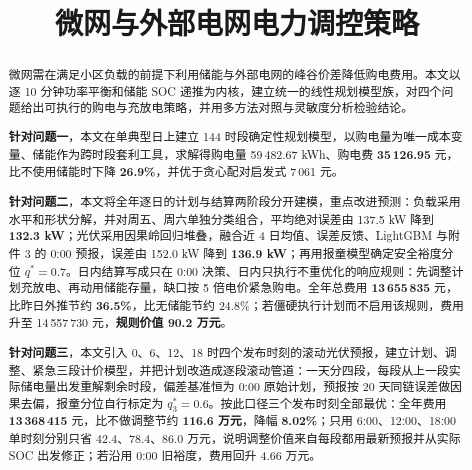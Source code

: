 \documentclass[withoutpreface,bwprint]{cumcmthesis}
\title{微网与外部电网电力调控策略}
\begin{document}
\maketitle

\begin{abstract}

微网需在满足小区负载的前提下利用储能与外部电网的峰谷价差降低购电费用\nobreak。本文以逐 10 分钟功率平衡和储能 SOC 递推为内核\nobreak，建立统一的线性规划模型族\nobreak，对四个问题给出可执行的购电与充放电策略\nobreak，并用多方法对照与灵敏度分析检验结论\nobreak。

\textbf{针对问题一}\nobreak，本文在单典型日上建立 144 时段确定性规划模型\nobreak，以购电量为唯一成本变量\nobreak、储能作为跨时段套利工具\nobreak，求解得购电量 59\,482.67 kWh\nobreak、购电费 \textbf{35\,126.95} 元\nobreak，比不使用储能时下降 \textbf{26.9\%}\nobreak，并优于贪心配对启发式 7\,061 元\nobreak。

\textbf{针对问题二}\nobreak，本文将全年逐日的计划与结算两阶段分开建模\nobreak，重点改进预测\nobreak：负载采用水平和形状分解\nobreak，并对周五\nobreak、周六单独分类组合\nobreak，平均绝对误差由 137.5 kW 降到 \textbf{132.3 kW}\nobreak；光伏采用因果岭回归堆叠\nobreak，融合近 4 日均值\nobreak、误差反馈\nobreak、LightGBM 与附件 3 的 0:00 预报\nobreak，误差由 152.0 kW 降到 \textbf{136.9 kW}\nobreak；再用报童模型确定安全裕度分位 $q^*=0.7$\nobreak。日内结算写成只在 0:00 决策\nobreak、日内只执行不重优化的响应规则\nobreak：先调整计划充放电\nobreak、再动用储能存量\nobreak，缺口按 5 倍电价紧急购电\nobreak。全年总费用 \textbf{13\,655\,835} 元\nobreak，比昨日外推节约 \textbf{36.5\%}\nobreak，比无储能节约 24.8\%\nobreak；若僵硬执行计划而不启用该规则\nobreak，费用升至 14\,557\,730 元\nobreak，\textbf{规则价值 90.2 万元}\nobreak。

\textbf{针对问题三}\nobreak，本文引入 0\nobreak、6\nobreak、12\nobreak、18 时四个发布时刻的滚动光伏预报\nobreak，建立计划\nobreak、调整\nobreak、紧急三段计价模型\nobreak，并把计划改造成逐段滚动管道\nobreak：一天分四段\nobreak，每段从上一段实际储电量出发重解剩余时段\nobreak，偏差基准恒为 0:00 原始计划\nobreak，预报按 20 天同链误差做因果去偏\nobreak，报童分位自行标定为 $q_3^*=0.6$\nobreak。按此口径三个发布时刻全部最优\nobreak：全年费用 \textbf{13\,368\,415} 元\nobreak，比不做调整节约 \textbf{116.6 万元}\nobreak，降幅 \textbf{8.02\%}\nobreak；只用 6:00\nobreak、12:00\nobreak、18:00 单时刻分别只省 42.4\nobreak、78.4\nobreak、86.0 万元\nobreak，说明调整价值来自每段都用最新预报并从实际 SOC 出发修正\nobreak；若沿用 0:00 旧裕度\nobreak，费用回升 4.66 万元\nobreak。


\end{abstract}
\end{document}
